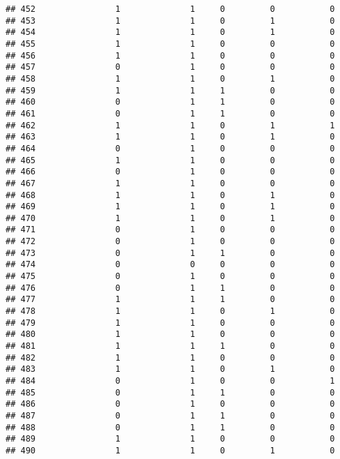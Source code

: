 \documentclass[]{article}
\begin{document}
\begin{verbatim}
## 452                1              1     0         0           0
## 453                1              1     0         1           0
## 454                1              1     0         1           0
## 455                1              1     0         0           0
## 456                1              1     0         0           0
## 457                0              1     0         0           0
## 458                1              1     0         1           0
## 459                1              1     1         0           0
## 460                0              1     1         0           0
## 461                0              1     1         0           0
## 462                1              1     0         1           1
## 463                1              1     0         1           0
## 464                0              1     0         0           0
## 465                1              1     0         0           0
## 466                0              1     0         0           0
## 467                1              1     0         0           0
## 468                1              1     0         1           0
## 469                1              1     0         1           0
## 470                1              1     0         1           0
## 471                0              1     0         0           0
## 472                0              1     0         0           0
## 473                0              1     1         0           0
## 474                0              0     0         0           0
## 475                0              1     0         0           0
## 476                0              1     1         0           0
## 477                1              1     1         0           0
## 478                1              1     0         1           0
## 479                1              1     0         0           0
## 480                1              1     0         0           0
## 481                1              1     1         0           0
## 482                1              1     0         0           0
## 483                1              1     0         1           0
## 484                0              1     0         0           1
## 485                0              1     1         0           0
## 486                0              1     0         0           0
## 487                0              1     1         0           0
## 488                0              1     1         0           0
## 489                1              1     0         0           0
## 490                1              1     0         1           0

\end{verbatim}
\end{document}
